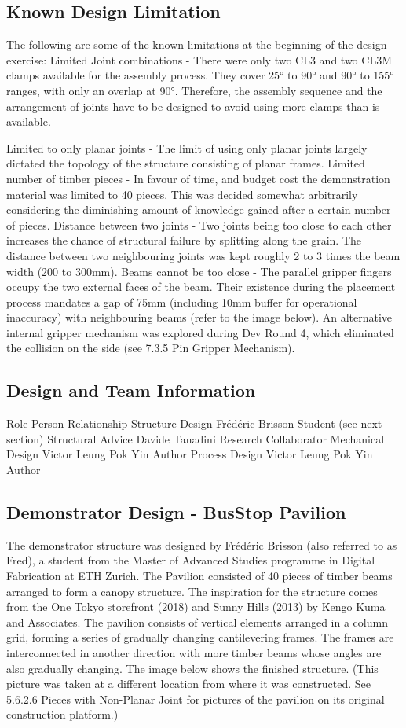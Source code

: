 \subsection{Known Design Limitation}
The following are some of the known limitations at the beginning of the design exercise:
Limited Joint combinations - There were only two CL3 and two CL3M clamps available for the assembly process. They cover 25° to 90° and 90° to 155° ranges, with only an overlap at 90°. Therefore, the assembly sequence and the arrangement of joints have to be designed to avoid using more clamps than is available.

Limited to only planar joints - The limit of using only planar joints largely dictated the topology of the structure consisting of planar frames. 
Limited number of timber pieces - In favour of time, and budget cost the demonstration material was limited to 40 pieces. This was decided somewhat arbitrarily considering the diminishing amount of knowledge gained after a certain number of pieces.
Distance between two joints - Two joints being too close to each other increases the chance of structural failure by splitting along the grain. The distance between two neighbouring joints was kept roughly 2 to 3 times the beam width (200 to 300mm).
Beams cannot be too close - The parallel gripper fingers occupy the two external faces of the beam. Their existence during the placement process mandates a gap of 75mm (including 10mm buffer for operational inaccuracy) with neighbouring beams (refer to the image below). An alternative internal gripper mechanism was explored during Dev Round 4, which eliminated the collision on the side (see 7.3.5 Pin Gripper Mechanism).

\subsection{Design and Team Information}
Role
Person
Relationship
Structure Design
Frédéric Brisson
Student (see next section)
Structural Advice
Davide Tanadini
Research Collaborator
Mechanical Design
Victor Leung Pok Yin
Author
Process Design
Victor Leung Pok Yin
Author


\subsection{Demonstrator Design - BusStop Pavilion}
The demonstrator structure was designed by Frédéric Brisson (also referred to as Fred), a student from the Master of Advanced Studies programme in Digital Fabrication at ETH Zurich. The Pavilion consisted of 40 pieces of timber beams arranged to form a canopy structure. 
The inspiration for the structure comes from the One Tokyo storefront (2018) and Sunny Hills (2013) by Kengo Kuma and Associates. The pavilion consists of vertical elements arranged in a column grid, forming a series of gradually changing cantilevering frames. The frames are interconnected in another direction with more timber beams whose angles are also gradually changing.
The image below shows the finished structure. (This picture was taken at a different location from where it was constructed. See 5.6.2.6 Pieces with Non-Planar Joint for pictures of the pavilion on its original construction platform.)

